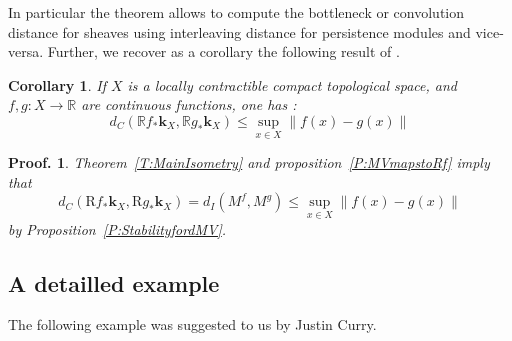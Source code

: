 \documentclass[a4paper, english, 11pt]{article}
\newcommand{\kk}[0]{\textbf{k}}
\newcommand{\0}{\vec{0}}
\newcommand{\R}[0]{\mathbb{R}}
\newcommand{\Rr}[0]{\text{R}}
\newtheorem*{pf}{Proof.} }
\newtheorem{cor}[prop]{Corollary}
\begin{document}
In particular the theorem allows to compute the bottleneck or convolution distance for sheaves using interleaving distance for persistence modules and vice-versa. Further, we recover as a corollary the following result of \cite{KS18}.
\begin{cor} If $X$ is a locally contractible compact topological space, and $f,g : X \to \R$ are continuous functions,  one has : $$d_C(\R f_* \kk_X, \R g_* \kk_X) \leq \sup_{x\in X} \|f(x) - g(x) \|$$
\end{cor}
\begin{pf}
 Theorem~\ref{T:MainIsometry} and proposition~\ref{P:MVmapstoRf} imply that $$d_C(\Rr f_* \kk_X, \Rr g_* \kk_X)= d_I(M^f, M^g)\leqslant  \sup_{x\in X} \|f(x) - g(x) \|$$ 
 by Proposition~\ref{P:StabilityfordMV}.
\end{pf}


\subsection{A detailled example} \label{SS:Projectionsfromcircle}
The following example was suggested to us by Justin Curry. 
\end{document}
